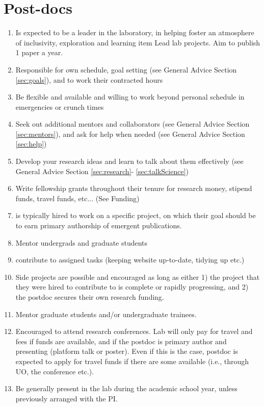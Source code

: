 \documentclass[12pt]{article}
\begin{document}
\section{Post-docs}
\begin{enumerate}
\item Is expected to be a leader in the laboratory, in helping foster
  an atmosphere of inclusivity, exploration and learning
 item Lead lab projects. Aim to publish 1 paper a year.
\item  Responsible for own schedule, goal setting (see General
  Advice Section \ref{sec:goals}), and to work their contracted hours
\item Be flexible and available and willing to work beyond personal
  schedule in emergencies or crunch times
\item Seek out additional mentors and collaborators (see General
  Advice Section \ref{sec:mentors}), and ask for help when needed (see
  General Advice Section \ref{sec:help})
\item Develop your research ideas and learn to talk about them
  effectively (see General Advice Section \ref{sec:research}-
  \ref{sec:talkScience})
\item  Write fellowship grants throughout their tenure
  for research money, stipend funds, travel funds, etc... (See Funding)
\item is typically hired to work on a specific project, on which
  their goal should be to earn primary authorship of emergent
  publications.
\item Mentor undergrads and graduate students
\item contribute to assigned tasks (keeping website up-to-date,
  tidying up etc.)
\item Side projects are possible and encouraged as long as either 1)
  the project that they were hired to contribute to is complete or
  rapidly progressing, and 2) the postdoc secures their own research
  funding.
\item Mentor graduate students and/or undergraduate trainees.
\item Encouraged to attend research conferences. Lab will only pay
  for travel and fees if funds are available, and if the postdoc is
  primary author and presenting (platform talk or poster). Even if
  this is the case, postdoc is expected to apply for travel funds if
  there are some available (i.e., through UO, the conference etc.).
\item Be generally present in the lab during the academic school year,
  unless previously arranged with the PI.

\end{enumerate}
\end{document}
